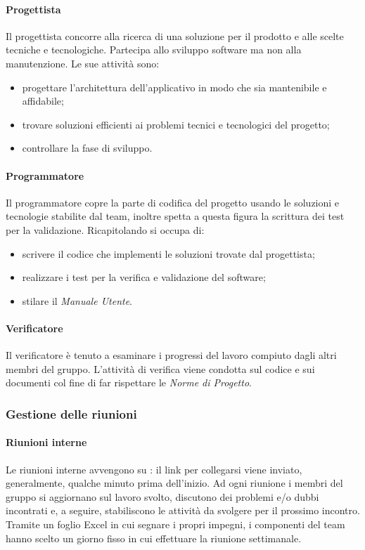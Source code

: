 \paragraph{Progettista} \hfill \break
Il progettista concorre alla ricerca di una soluzione per il prodotto e alle scelte tecniche e tecnologiche.
Partecipa allo sviluppo software ma non alla manutenzione. Le sue attività sono:
\begin{itemize}
    \item progettare l'architettura dell'applicativo in modo che sia mantenibile e affidabile;
    \item trovare soluzioni efficienti ai problemi tecnici e tecnologici del progetto;
    \item controllare la fase di sviluppo.
\end{itemize}

\paragraph{Programmatore} \hfill \break
Il programmatore copre la parte di codifica del progetto usando le soluzioni e tecnologie stabilite dal team, inoltre
spetta a questa figura la scrittura dei test per la validazione. Ricapitolando si occupa di:
\begin{itemize}
    \item scrivere il codice che implementi le soluzioni trovate dal progettista;
    \item realizzare i test per la verifica e validazione del software;
    \item stilare il \emph{Manuale Utente}.
\end{itemize}

\paragraph{Verificatore} \hfill \break
Il verificatore è tenuto a esaminare i progressi del lavoro compiuto dagli altri membri del gruppo.   
L'attività di verifica viene condotta sul codice e sui documenti col fine di far rispettare le \emph{Norme di Progetto}.

\subsubsection{Gestione delle riunioni}
\paragraph{Riunioni interne} \hfill \break
Le riunioni interne avvengono su : il link per collegarsi viene inviato, generalmente, 
qualche minuto prima dell'inizio. Ad ogni riunione i membri del gruppo si aggiornano sul lavoro svolto, discutono dei problemi e/o dubbi incontrati 
e, a seguire, stabiliscono le attività da svolgere per il prossimo incontro. Tramite un foglio Excel in cui segnare i propri impegni, 
i componenti del team hanno scelto un giorno fisso in cui effettuare la riunione settimanale.

